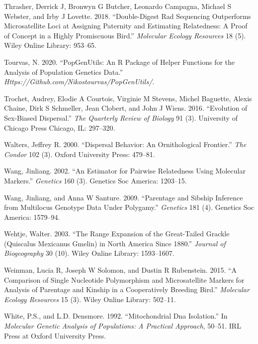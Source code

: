 \documentclass[]{article}
\begin{document}
\leavevmode\hypertarget{ref-thrasher2018double}{}%
Thrasher, Derrick J, Bronwyn G Butcher, Leonardo Campagna, Michael S
Webster, and Irby J Lovette. 2018. ``Double-Digest Rad Sequencing
Outperforms Microsatellite Loci at Assigning Paternity and Estimating
Relatedness: A Proof of Concept in a Highly Promiscuous Bird.''
\emph{Molecular Ecology Resources} 18 (5). Wiley Online Library:
953--65.

\leavevmode\hypertarget{ref-Tourvas2020popgenutils}{}%
Tourvas, N. 2020. ``PopGenUtils: An R Package of Helper Functions for
the Analysis of Population Genetics Data.''
\emph{Https://Github.com/Nikostourvas/PopGenUtils/}.

\leavevmode\hypertarget{ref-trochet2016evolution}{}%
Trochet, Audrey, Elodie A Courtois, Virginie M Stevens, Michel Baguette,
Alexis Chaine, Dirk S Schmeller, Jean Clobert, and John J Wiens. 2016.
``Evolution of Sex-Biased Dispersal.'' \emph{The Quarterly Review of
Biology} 91 (3). University of Chicago Press Chicago, IL: 297--320.

\leavevmode\hypertarget{ref-walters2000dispersal}{}%
Walters, Jeffrey R. 2000. ``Dispersal Behavior: An Ornithological
Frontier.'' \emph{The Condor} 102 (3). Oxford University Press: 479--81.

\leavevmode\hypertarget{ref-wang2002estimator}{}%
Wang, Jinliang. 2002. ``An Estimator for Pairwise Relatedness Using
Molecular Markers.'' \emph{Genetics} 160 (3). Genetics Soc America:
1203--15.

\leavevmode\hypertarget{ref-wang2009parentage}{}%
Wang, Jinliang, and Anna W Santure. 2009. ``Parentage and Sibship
Inference from Multilocus Genotype Data Under Polygamy.''
\emph{Genetics} 181 (4). Genetics Soc America: 1579--94.

\leavevmode\hypertarget{ref-wehtje2003range}{}%
Wehtje, Walter. 2003. ``The Range Expansion of the Great-Tailed Grackle
(Quiscalus Mexicanus Gmelin) in North America Since 1880.''
\emph{Journal of Biogeography} 30 (10). Wiley Online Library:
1593--1607.

\leavevmode\hypertarget{ref-weinman2015comparison}{}%
Weinman, Lucia R, Joseph W Solomon, and Dustin R Rubenstein. 2015. ``A
Comparison of Single Nucleotide Polymorphism and Microsatellite Markers
for Analysis of Parentage and Kinship in a Cooperatively Breeding
Bird.'' \emph{Molecular Ecology Resources} 15 (3). Wiley Online Library:
502--11.

\leavevmode\hypertarget{ref-white1992mitochondrial}{}%
White, P.S., and L.D. Densmore. 1992. ``Mitochondrial Dna Isolation.''
In \emph{Molecular Genetic Analysis of Populations: A Practical
Approach}, 50--51. IRL Press at Oxford University Press.
\end{document}
